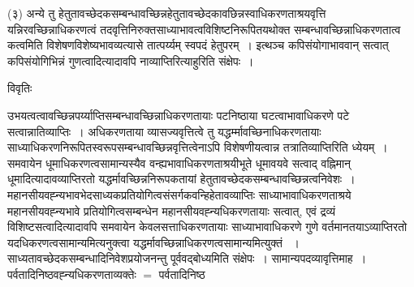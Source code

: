 \documentclass[10pt, openany]{book}
\begin{document}
{{{\vpc (३) अन्ये तु }हेतुतावच्छेदकसम्बन्धावच्छिन्नहेतुतावच्छेदकावछिन्नस्वाधिकरणताश्रयवृत्ति यन्निरवच्छिन्नाधिकरणत्वं तदवृत्तिनिरुक्तसाध्याभावत्वविशिष्टनिरूपितयथोक्त सम्बन्धावच्छिन्नाधिकरणतात्व कत्वमिति विशेषणविशेष्यभावव्यत्यासे तात्पर्य्यम् स्वपदं हेतुपरम्~। इत्थञ्च कपिसंयोगाभाववान् सत्वात् कपिसंयोगिभिन्नं गुणत्वादित्यादावपि नाव्याप्तिरित्याहुरिति संक्षेपः~।}
\begin{center}     विवृतिः \end{center}
उभयत्वत्वावच्छिन्नपर्य्याप्तिसम्बन्धावच्छिन्नाधिकरणतायाः पटनिष्ठाया घटत्वाभावाधिकरणे पटे सत्वान्नातिव्याप्तिः~। अधिकरणताया व्यासज्यवृत्तित्वे तु यद्धर्म्मावच्छिनाधिकरणतायाः साध्याधिकरणनिरूपितस्वरूपसम्बन्धावच्छिन्नवृत्तित्वेनाऽपि विशेषणीयत्वान्न तत्रातिव्याप्तिरिति ध्येयम्~। समवायेन धूमाधिकरणत्वसामान्यस्यैव वन्ह्यभावाधिकरणताश्रयीभूते धूमावयवे सत्वाद् वह्निमान् धूमादित्यादावव्याप्तिरतो यद्धर्मावच्छिन्ननिरूपकतायां हेतुतावच्छेदकसम्बन्धावच्छिन्नत्वनिवेशः~। महानसीयवह्न्यभावभेदसाध्यकप्रतियोगित्वसंसर्गकवन्हिहेतावव्याप्तिः साध्याभावाधिकरणताश्रये महानसीयवह्न्यभावे प्रतियोगित्वसम्बन्धेन महानसीयवह्न्यधिकरणतायाः सत्वात्, एवं द्रव्यं विशिष्टसत्वादित्यादावपि समवायेन केवलसत्ताधिकरणतायाः साध्याभावाधिकरणे गुणे वर्तमानतयाऽव्याप्तिरतो यदधिकरणत्वसामान्यमित्यनुक्त्वा यद्धर्मावच्छिन्नाधिकरणत्वसामान्यमित्युक्तं ~। साध्यतावच्छेदकसम्बन्धादिनिवेशप्रयोजनन्तु पूर्ववद्बोध्यमिति संक्षेपः~। सामान्यपदव्यावृत्तिमाह~।
पर्वतादिनिष्ठवह्न्यधिकरणताव्यक्तेः $=$ पर्वतादिनिष्ठ

}
\end{document}
